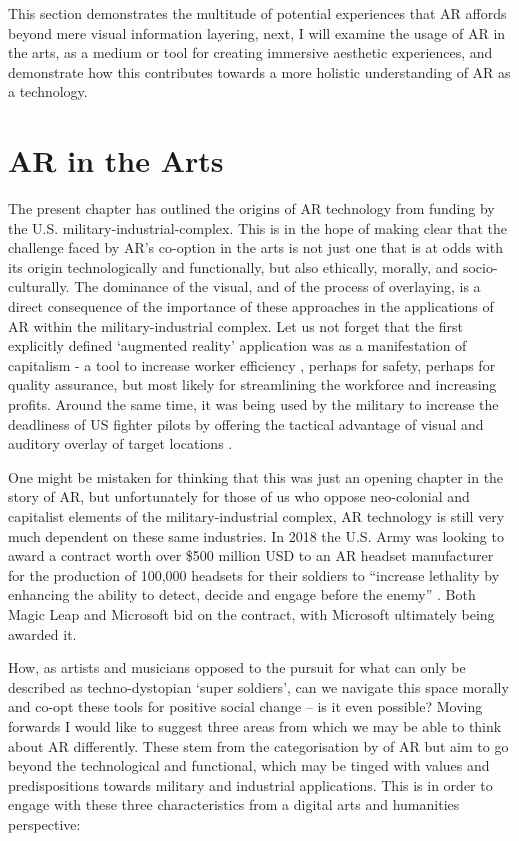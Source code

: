  This section demonstrates the multitude of potential experiences that AR affords beyond mere visual information layering, next, I will examine the usage of AR in the arts, as a medium or tool for creating immersive aesthetic experiences, and demonstrate how this contributes towards a more holistic understanding of AR as a technology. 



\section{AR in the Arts}\label{sec: ar-arts}
The present chapter has outlined the origins of AR technology from funding by the U.S. military-industrial-complex. This is in the hope of making clear that the challenge faced by AR's co-option in the arts is not just one that is at odds with its origin technologically and functionally, but also ethically, morally, and socio-culturally. The dominance of the visual, and of the process of overlaying, is a direct consequence of the importance of these approaches in the applications of AR within the military-industrial complex. Let us not forget that the first explicitly defined `augmented reality' application was as a manifestation of capitalism - a tool to increase worker efficiency \citep{caudell1992}, perhaps for safety, perhaps for quality assurance, but most likely for streamlining the workforce and increasing profits. Around the same time, it was being used by the military to increase the deadliness of US fighter pilots by offering the tactical advantage of visual and auditory overlay of target locations \citep{wanstall1989}. 

One might be mistaken for thinking that this was just an opening chapter in the story of AR, but unfortunately for those of us who oppose neo-colonial and capitalist elements of the military-industrial complex, AR technology is still very much dependent on these same industries. In 2018 the U.S. Army was looking to award a contract worth over \$500 million USD to an AR headset manufacturer for the production of 100,000 headsets for their soldiers to ``increase lethality by enhancing the ability to detect, decide and engage before the enemy'' \citep{brustein2018}. Both Magic Leap and Microsoft bid on the contract, with Microsoft ultimately being awarded it.

How, as artists and musicians opposed to the pursuit for what can only be described as techno-dystopian `super soldiers', can we navigate this space morally and co-opt these tools for positive social change --  is it even possible? Moving forwards I would like to suggest three areas from which we may be able to think about AR differently. These stem from the categorisation by \citep{azuma1997} of AR but aim to go beyond the technological and functional, which may be tinged with values and predispositions towards military and industrial applications. This is in order to engage with these three characteristics from a digital arts and humanities perspective:

